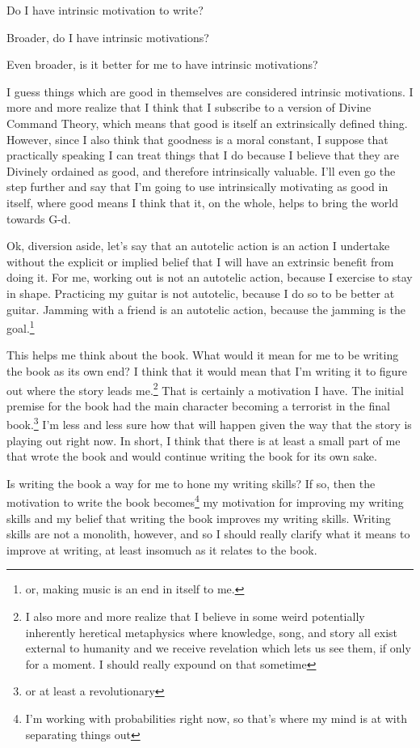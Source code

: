 \documentclass[12pt]{article}[titlepage]
\renewcommand{\,}{\textsuperscript{,}}
\begin{document}
Do I have intrinsic motivation to write?

Broader, do I have intrinsic motivations?

Even broader, is it better for me to have intrinsic motivations?

I guess things which are good in themselves are considered intrinsic motivations.  
I more and more realize that I think that I subscribe to a version of Divine Command Theory, which means that good is itself an extrinsically defined thing.  
However, since I also think that goodness is a moral constant, I suppose that practically speaking I can treat things that I do because I believe that they are Divinely ordained as good, and therefore intrinsically valuable.  
I'll even go the step further and say that I'm going to use intrinsically motivating as good in itself, where good means I think that it, on the whole, helps to bring the world towards G-d.

Ok, diversion aside, let's say that an autotelic action is an action I undertake without the explicit or implied belief that I will have an extrinsic benefit from doing it.  
For me, working out is not an autotelic action, because I exercise to stay in shape.  
Practicing my guitar is not autotelic, because I do so to be better at guitar.  
Jamming with a friend is an autotelic action, because the jamming is the goal.\footnote{or, making music is an end in itself to me.}

This helps me think about the book.  
What would it mean for me to be writing the book as its own end?  
I think that it would mean that I'm writing it to figure out where the story leads me.\footnote{I also more and more realize that I believe in some weird potentially inherently heretical metaphysics where knowledge, song, and story all exist external to humanity and we receive revelation which lets us see them, if only for a moment. I should really expound on that sometime}  
That is certainly a motivation I have.  
The initial premise for the book had the main character becoming a terrorist in the final book.\footnote{or at least a revolutionary}  
I'm less and less sure how that will happen given the way that the story is playing out right now.  
In short, I think that there is at least a small part of me that wrote the book and would continue writing the book for its own sake.

Is writing the book a way for me to hone my writing skills?  
If so, then the motivation to write the book becomes\footnote{I'm working with probabilities right now, so that's where my mind is at with separating things out} my motivation for improving my writing skills and my belief that writing the book improves my writing skills.  
Writing skills are not a monolith, however, and so I should really clarify what it means to improve at writing, at least insomuch as it relates to the book.
\end{document}
